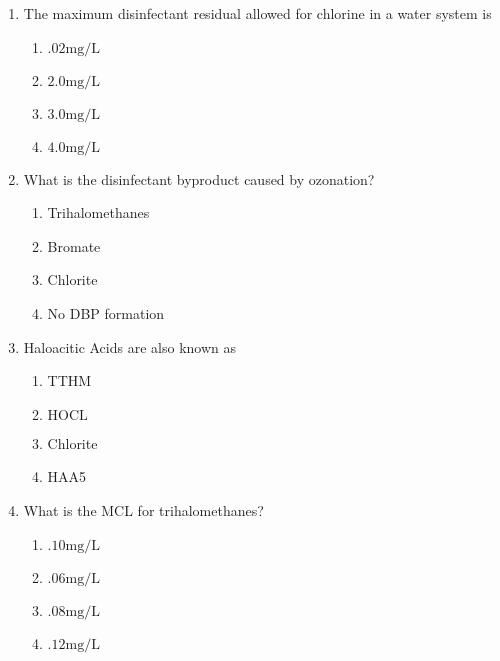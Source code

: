 \begin{enumerate}
\item The maximum disinfectant residual allowed for chlorine in a water system is\\
\begin{enumerate}
\item $.02 \mathrm{mg} / \mathrm{L}$\\
\item $2.0 \mathrm{mg} / \mathrm{L}$\\
\item $3.0 \mathrm{mg} / \mathrm{L}$\\
\item $4.0 \mathrm{mg} / \mathrm{L}$
\end{enumerate}

\item  What is the disinfectant byproduct caused by ozonation?\\
\begin{enumerate}
\item Trihalomethanes\\
\item Bromate\\
\item Chlorite\\
\item No DBP formation
\end{enumerate}

\item  Haloacitic Acids are also known as\\
\begin{enumerate}
\item TTHM\\
\item $\mathrm{HOCL}$\\
\item Chlorite\\
\item HAA5
\end{enumerate}

\item  What is the MCL for trihalomethanes?\\
\begin{enumerate}
\item $.10 \mathrm{mg} / \mathrm{L}$\\
\item $.06 \mathrm{mg} / \mathrm{L}$\\
\item $.08 \mathrm{mg} / \mathrm{L}$\\
\item $.12 \mathrm{mg} / \mathrm{L}$
\end{enumerate}


\end{enumerate}
